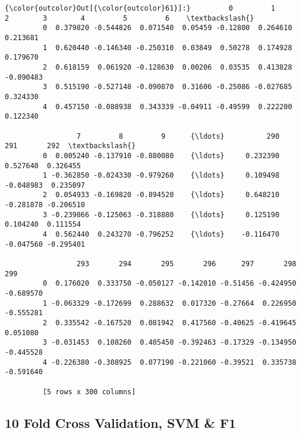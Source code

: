 \documentclass[11pt]{article}
\begin{document}
\begin{Verbatim}[commandchars=\\\{\}]
{\color{outcolor}Out[{\color{outcolor}61}]:}         0         1         2        3        4         5         6    \textbackslash{}
         0  0.379820 -0.544826  0.071540  0.05459 -0.12800  0.264610  0.213681   
         1  0.620440 -0.146340 -0.250310  0.03849  0.50278  0.174928  0.179670   
         2  0.618159  0.061920 -0.128630  0.00206  0.03535  0.413828 -0.090483   
         3  0.515190 -0.527148 -0.090870  0.31606 -0.25086 -0.027685  0.324330   
         4  0.457150 -0.088938  0.343339 -0.04911 -0.49599  0.222200  0.122340   
         
                 7         8         9      {\ldots}          290       291       292  \textbackslash{}
         0  0.005240 -0.137910 -0.880080    {\ldots}     0.232390  0.527640  0.326455   
         1 -0.362850 -0.024330 -0.979260    {\ldots}     0.109498 -0.048983  0.235097   
         2  0.054933 -0.169820 -0.894520    {\ldots}     0.648210 -0.281878 -0.206510   
         3 -0.239866 -0.125063 -0.318880    {\ldots}     0.125190  0.104240  0.111554   
         4  0.562440  0.243270 -0.796252    {\ldots}    -0.116470 -0.047560 -0.295401   
         
                 293       294       295       296      297       298       299  
         0  0.176020  0.333750 -0.050127 -0.142010 -0.51456 -0.424950 -0.689570  
         1 -0.063329 -0.172699  0.288632  0.017320 -0.27664  0.226950 -0.555281  
         2  0.335542 -0.167520  0.081942  0.417560 -0.40625 -0.419645  0.051080  
         3 -0.031453  0.108260  0.405450 -0.392463 -0.17329 -0.134950 -0.445528  
         4 -0.226380 -0.308925  0.077190 -0.221060 -0.39521  0.335738 -0.591640  
         
         [5 rows x 300 columns]
\end{Verbatim}
            
    \subsection{10 Fold Cross Validation, SVM \&
F1}\label{fold-cross-validation-svm-f1}
\end{document}
